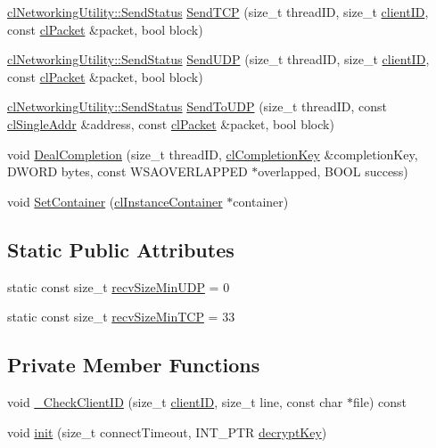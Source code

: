 \begin{DoxyCompactItemize}
\item 
\hyperlink{classcl_networking_utility_a19389cda12603396e03caa9d82073803}{clNetworkingUtility::SendStatus} \hyperlink{classcl_client_state_a4aeba181b4a720a0d545c0e25caa205d}{SendTCP} (size\_\-t threadID, size\_\-t \hyperlink{classcl_client_state_a4153db8a239f862cbd61bf8e75e25794}{clientID}, const \hyperlink{classcl_packet}{clPacket} \&packet, bool block)
\item 
\hyperlink{classcl_networking_utility_a19389cda12603396e03caa9d82073803}{clNetworkingUtility::SendStatus} \hyperlink{classcl_client_state_ab05b47be38699babada23180023604f9}{SendUDP} (size\_\-t threadID, size\_\-t \hyperlink{classcl_client_state_a4153db8a239f862cbd61bf8e75e25794}{clientID}, const \hyperlink{classcl_packet}{clPacket} \&packet, bool block)
\item 
\hyperlink{classcl_networking_utility_a19389cda12603396e03caa9d82073803}{clNetworkingUtility::SendStatus} \hyperlink{classcl_client_state_aff27b2186960a4b8279e77ba8df634d0}{SendToUDP} (size\_\-t threadID, const \hyperlink{classcl_single_addr}{clSingleAddr} \&address, const \hyperlink{classcl_packet}{clPacket} \&packet, bool block)
\item 
void \hyperlink{classcl_client_state_aa6eebf5f365dc2afe8617973a9f40049}{DealCompletion} (size\_\-t threadID, \hyperlink{classcl_completion_key}{clCompletionKey} \&completionKey, DWORD bytes, const WSAOVERLAPPED $\ast$overlapped, BOOL success)
\item 
void \hyperlink{classcl_client_state_afd1442e1b167bb89c198582804bdb7c9}{SetContainer} (\hyperlink{classcl_instance_container}{clInstanceContainer} $\ast$container)
\end{DoxyCompactItemize}
\subsection*{Static Public Attributes}
\begin{DoxyCompactItemize}
\item 
static const size\_\-t \hyperlink{classcl_client_state_a0941e83ecbd7a734a83e9759e622c7a3}{recvSizeMinUDP} = 0
\item 
static const size\_\-t \hyperlink{classcl_client_state_ac4ab48651bcfd9249d396771f9bb7f58}{recvSizeMinTCP} = 33
\end{DoxyCompactItemize}
\subsection*{Private Member Functions}
\begin{DoxyCompactItemize}
\item 
void \hyperlink{classcl_client_state_ae6a4b95bd73627ae1f3c7a512eb13112}{\_\-CheckClientID} (size\_\-t \hyperlink{classcl_client_state_a4153db8a239f862cbd61bf8e75e25794}{clientID}, size\_\-t line, const char $\ast$file) const 
\item 
void \hyperlink{classcl_client_state_a913aba070282c4e7c3de92d8e3de3d9a}{init} (size\_\-t connectTimeout, INT\_\-PTR \hyperlink{classcl_client_state_ab8feb66a89295b2ee744245aad8e86ba}{decryptKey})
\end{DoxyCompactItemize}
